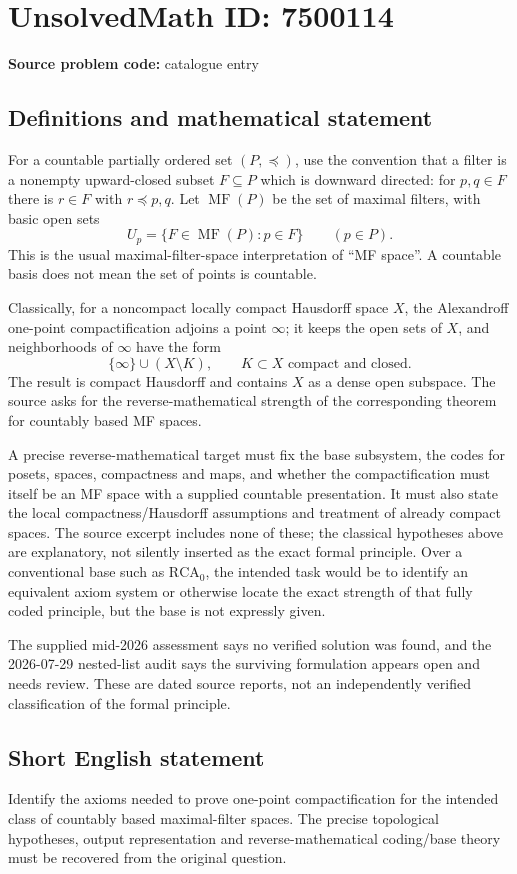 \documentclass[11pt]{article}
\begin{document}
\section*{UnsolvedMath ID: 7500114}
\textbf{Source problem code:} catalogue entry
\subsection{Definitions and mathematical statement}
For a countable partially ordered set \((P,\preceq)\), use the convention that a filter is a nonempty upward-closed subset \(F\subseteq P\) which is downward directed: for \(p,q\in F\) there is \(r\in F\) with \(r\preceq p,q\). Let \(\operatorname{MF}(P)\) be the set of maximal filters, with basic open sets
\[
 U_p=\{F\in\operatorname{MF}(P):p\in F\}\qquad(p\in P).
\]
This is the usual maximal-filter-space interpretation of ``MF space''. A countable basis does not mean the set of points is countable.

Classically, for a noncompact locally compact Hausdorff space \(X\), the Alexandroff one-point compactification adjoins a point \(\infty\); it keeps the open sets of \(X\), and neighborhoods of \(\infty\) have the form
\[
 \{\infty\}\cup(X\setminus K),\qquad K\subset X\text{ compact and closed}.
\]
The result is compact Hausdorff and contains \(X\) as a dense open subspace. The source asks for the reverse-mathematical strength of the corresponding theorem for countably based MF spaces.

A precise reverse-mathematical target must fix the base subsystem, the codes for posets, spaces, compactness and maps, and whether the compactification must itself be an MF space with a supplied countable presentation. It must also state the local compactness/Hausdorff assumptions and treatment of already compact spaces. The source excerpt includes none of these; the classical hypotheses above are explanatory, not silently inserted as the exact formal principle. Over a conventional base such as \(\mathrm{RCA}_0\), the intended task would be to identify an equivalent axiom system or otherwise locate the exact strength of that fully coded principle, but the base is not expressly given.

The supplied mid-2026 assessment says no verified solution was found, and the 2026-07-29 nested-list audit says the surviving formulation appears open and needs review. These are dated source reports, not an independently verified classification of the formal principle.
\subsection{Short English statement}
Identify the axioms needed to prove one-point compactification for the intended class of countably based maximal-filter spaces. The precise topological hypotheses, output representation and reverse-mathematical coding/base theory must be recovered from the original question.
\end{document}
